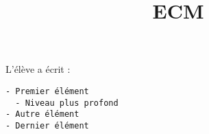 \documentclass{article}
\title{ECM}
\begin{document}
\color{red}

L'élève a écrit :

\lstset{language=java,numbers=none}
\begin{lstlisting}
- Premier élément
  - Niveau plus profond
- Autre élément
- Dernier élément
\end{lstlisting}
\end{document}
